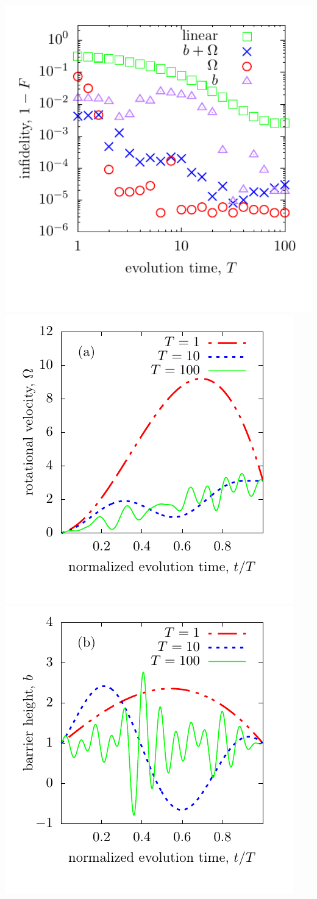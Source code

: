 \documentclass{beamer}
\begin{document}
\begin{frame}
\begin{columns}
\includegraphics[width=1.2\textwidth]{../data/1d/figlfid.pdf}
\includegraphics[width=.49\textwidth]{../data/1d/figR1.pdf}
\includegraphics[width=.49\textwidth]{../data/1d/figB1.pdf}
\end{columns}
\end{frame}
\end{document}
